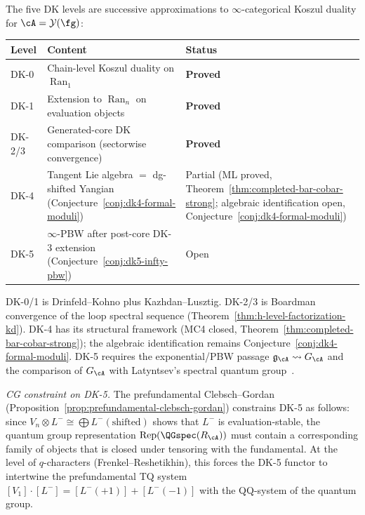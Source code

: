 \begin{remark}
\label{rem:unified-dk-hierarchy}
The five DK levels are successive approximations to $\infty$-categorical Koszul duality for $\cA = \mathcal{Y}(\fg)$:
\begin{center}
\renewcommand{\arraystretch}{1.2}
\begin{tabular}{lll}
\textbf{Level} & \textbf{Content} & \textbf{Status} \\
\hline
DK-0 & Chain-level Koszul duality on $\operatorname{Ran}_1$
 & \textbf{Proved} \\
DK-1 & Extension to $\operatorname{Ran}_n$ on evaluation objects
 & \textbf{Proved} \\
DK-2/3 & Generated-core DK comparison (sectorwise convergence)
 & \textbf{Proved} \\
DK-4 & Tangent Lie algebra $=$ dg-shifted Yangian (Conjecture~\ref{conj:dk4-formal-moduli})
 & Partial (ML proved, Theorem~\ref{thm:completed-bar-cobar-strong}; algebraic identification open, Conjecture~\ref{conj:dk4-formal-moduli}) \\
DK-5 & $\infty$-PBW after post-core DK-3 extension (Conjecture~\ref{conj:dk5-infty-pbw})
 & Open \\
\end{tabular}
\end{center}
DK-0/1 is Drinfeld--Kohno plus Kazhdan--Lusztig. DK-2/3 is Boardman
convergence of the loop spectral sequence
\textup{(}Theorem~\ref{thm:h-level-factorization-kd}\textup{)}.
DK-4 has its structural framework
\textup{(}MC4 closed, Theorem~\ref{thm:completed-bar-cobar-strong}\textup{)};
the algebraic identification remains
Conjecture~\ref{conj:dk4-formal-moduli}. DK-5 requires the
exponential/PBW passage
$\mathfrak{g}_{\cA}\rightsquigarrow G_{\cA}$ and the comparison of
$G_{\cA}$ with Latyntsev's spectral quantum group~\cite{Latyntsev23}.

\emph{CG constraint on DK-5.}
The prefundamental Clebsch--Gordan
(Proposition~\ref{prop:prefundamental-clebsch-gordan})
constrains DK-5 as follows: since
$V_n \otimes L^- \cong \bigoplus L^-(\text{shifted})$
shows that $L^-$ is evaluation-stable, the quantum group
representation $\operatorname{Rep}(\QGspec(R_{\cA}))$ must
contain a corresponding family of objects that is closed under
tensoring with the fundamental. At the level of $q$-characters
(Frenkel--Reshetikhin), this forces the DK-5 functor to
intertwine the prefundamental TQ system
$[V_1] \cdot [L^-] = [L^-(+1)] + [L^-(-1)]$
with the QQ-system of the quantum group.
\end{remark}

